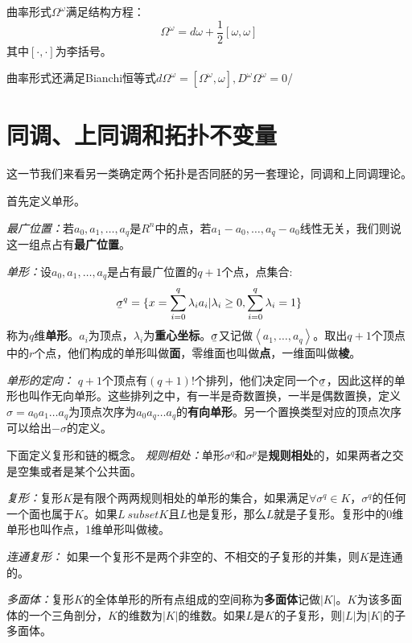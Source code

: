 \documentclass[supercite]{HustGraduPaper}
\newcommand{\ubar}[1]{\text{\b{$#1$}}}
\newcommand{\avg}[1]{\left\langle #1 \right\rangle}
\begin{document}
\begin{appendices}
		曲率形式$\Omega^\omega$满足结构方程：
		\begin{equation}
		\Omega^\omega = d\omega + \frac{1}{2}[\omega,\omega]
		\end{equation}
		其中$[\cdot,\cdot]$为李括号。
		
		曲率形式还满足Bianchi恒等式$d\Omega^\omega = [\Omega^\omega,\omega], D^\omega \Omega^\omega = 0$/
		\section{同调、上同调和拓扑不变量\label{Appendix: Coh}}
		
		
		这一节我们来看另一类确定两个拓扑是否同胚的另一套理论，同调和上同调理论。
		
		
		首先定义单形。
		
		\textit{最广位置：}若$a_0,a_1,\ldots,a_q$是$R^n$中的点，若$a_1 -a_0, \ldots, a_q-a_0$线性无关，我们则说这一组点占有\textbf{最广位置}。
		
		\textit{单形：}设$a_0,a_1,\ldots,a_q$是占有最广位置的$q+1$个点，点集合:
		\begin{equation}
		\ubar{\sigma}^q = \{x = \sum_{i = 0}^q \lambda_i a_i| \lambda_i \ge 0, \sum_{i = 0}^q \lambda_i = 1 \}
		\end{equation}
		称为$q$维\textbf{单形}。$a_i$为顶点，$\lambda_i$为\textbf{重心坐标}。$\ubar{\sigma}$又记做$\avg{a_1,\ldots,a_q}$。取出$q+1$个顶点中的$r$个点，他们构成的单形叫做\textbf{面}，零维面也叫做\textbf{点}，一维面叫做\textbf{棱}。
		
		\textit{单形的定向：} $q+1$个顶点有$(q+1)!$个排列，他们决定同一个$\ubar{\sigma}$，因此这样的单形也叫作无向单形。这些排列之中，有一半是奇数置换，一半是偶数置换，定义$\sigma = a_0a_1\ldots a_q$为顶点次序为$a_0a_q\ldots a_q$的\textbf{有向单形}。另一个置换类型对应的顶点次序可以给出$-\sigma$的定义。
		
		下面定义复形和链的概念。
		\textit{规则相处：}单形$\sigma^q$和$\sigma^p$是\textbf{规则相处}的，如果两者之交是空集或者是某个公共面。
		
		\textit{复形：}复形$K$是有限个两两规则相处的单形的集合，如果满足$\forall \sigma^q \in K$，$\sigma^q$的任何一个面也属于$K$。如果$L \ subset K$且$L$也是复形，那么$L$就是子复形。复形中的0维单形也叫作点，1维单形叫做棱。
		
		\textit{连通复形：} 如果一个复形不是两个非空的、不相交的子复形的并集，则$K$是连通的。
		
		\textit{多面体：}复形$K$的全体单形的所有点组成的空间称为\textbf{多面体}记做$|K|$。$K$为该多面体的一个三角剖分，$K$的维数为$|K|$的维数。如果$L$是$K$的子复形，则$|L|$为$|K|$的子多面体。
		

\end{appendices}
\end{document}
